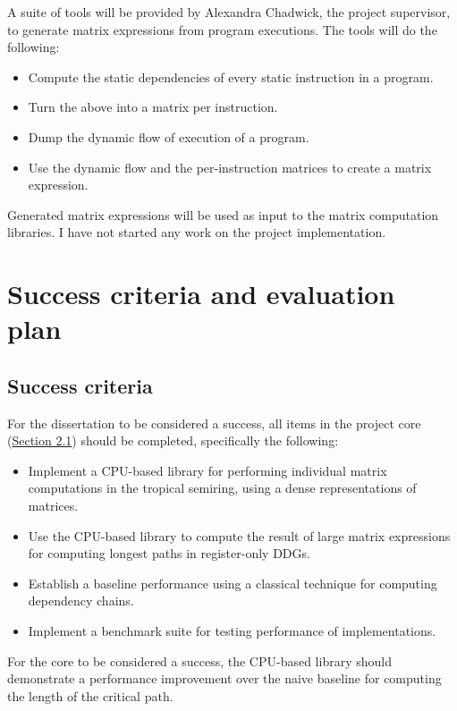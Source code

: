 \documentclass[a4paper,12pt]{article}
\begin{document}
A suite of tools will be provided by Alexandra Chadwick, the project supervisor,
to generate matrix expressions from program executions.
The tools will do the following:
\begin{itemize}
  \item Compute the static dependencies of every static instruction in a program.
  \item Turn the above into a matrix per instruction.
  \item Dump the dynamic flow of execution of a program.
  \item Use the dynamic flow and the per-instruction matrices to create a matrix expression.
\end{itemize}
Generated matrix expressions will be used as input to the matrix computation libraries.
I have not started any work on the project implementation.

\section{Success criteria and evaluation plan}

\subsection{Success criteria}

For the dissertation to be considered a success, all items in the project core
(\hyperref[sec:core]{Section 2.1}) should be completed, specifically the following:
\begin{itemize}
  \item Implement a CPU-based library for performing individual matrix
    computations in the tropical semiring, using a dense representations of matrices.
  \item Use the CPU-based library to compute the result of large matrix expressions
    for computing longest paths in register-only DDGs.
  \item Establish a baseline performance using a classical technique for computing
    dependency chains.
  \item Implement a benchmark suite for testing performance of implementations.
\end{itemize}
For the core to be considered a success, the CPU-based library should demonstrate a
performance improvement over the naive baseline for computing the length of the critical path.
\end{document}
